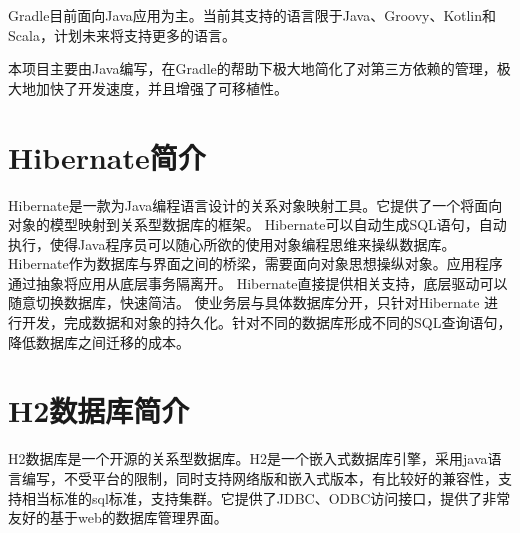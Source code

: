 Gradle目前面向Java应用为主。当前其支持的语言限于Java、Groovy、Kotlin和Scala，计划未来将支持更多的语言。

本项目主要由Java编写，在Gradle的帮助下极大地简化了对第三方依赖的管理，极大地加快了开发速度，并且增强了可移植性。

\section{Hibernate简介}

Hibernate是一款为Java编程语言设计的关系对象映射工具。它提供了一个将面向对象的模型映射到关系型数据库的框架。
Hibernate可以自动生成SQL语句，自动执行，使得Java程序员可以随心所欲的使用对象编程思维来操纵数据库。
Hibernate作为数据库与界面之间的桥梁，需要面向对象思想操纵对象。应用程序通过抽象将应用从底层事务隔离开。
Hibernate直接提供相关支持，底层驱动可以随意切换数据库，快速简洁。
使业务层与具体数据库分开，只针对Hibernate 进行开发，完成数据和对象的持久化。针对不同的数据库形成不同的SQL查询语句，降低数据库之间迁移的成本。

\section{H2数据库简介}

H2数据库是一个开源的关系型数据库。H2是一个嵌入式数据库引擎，采用java语言编写，不受平台的限制，同时支持网络版和嵌入式版本，有比较好的兼容性，支持相当标准的sql标准，支持集群。它提供了JDBC、ODBC访问接口，提供了非常友好的基于web的数据库管理界面。



























